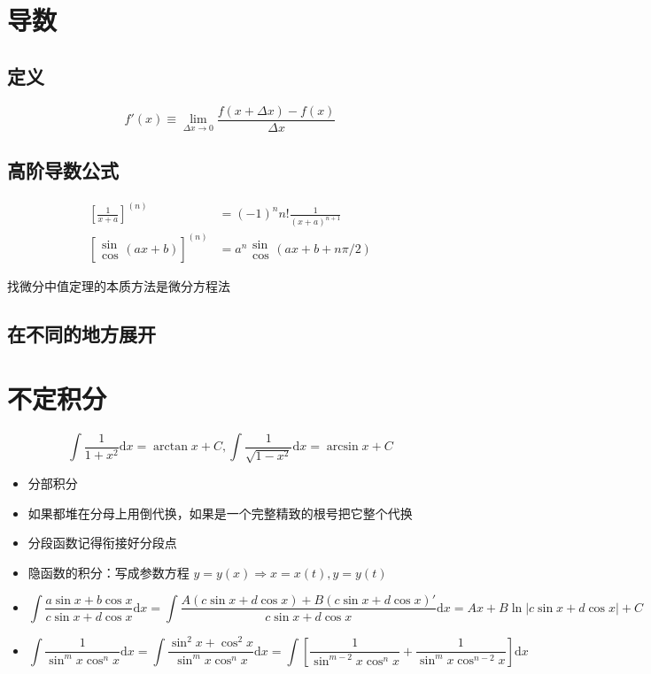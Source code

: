 \documentclass{article}
\begin{document}
\section{导数}

\subsection{定义}

\[ f'(x) \equiv \lim_{\Delta x \to 0} \frac{f(x + \Delta x) - f(x)}{\Delta x} \]

\subsection{高阶导数公式}

\begin{align*}
    \left[\frac{1}{x + a}\right]^{(n)}   & = (-1)^n n! \frac{1}{(x + a)^{n+1}}             \\
    \left[\begin{aligned}
                  \sin \\ \cos
              \end{aligned} (a x + b)\right]^{(n)} & = a^n \begin{aligned}
                                                           \sin \\ \cos
                                                       \end{aligned} (a x + b + n \pi / 2)
\end{align*}

找微分中值定理的本质方法是微分方程法

\subsection{在不同的地方展开}

\section{不定积分}

\[ \int \frac{1}{1 + x^2} \mathrm{d}x = \arctan x + C, \int \frac{1}{\sqrt{1 - x^2}} \mathrm{d}x = \arcsin x + C \]

\begin{itemize}
    \item 分部积分
    \item 如果都堆在分母上用倒代换，如果是一个完整精致的根号把它整个代换
    \item 分段函数记得衔接好分段点
    \item 隐函数的积分：写成参数方程 $y = y(x) \Rightarrow x = x(t), y = y(t)$
    \item \[ \int \frac{a \sin x + b \cos x}{c \sin x + d \cos x} \mathrm{d}x = \int \frac{A (c \sin x + d \cos x) + B (c \sin x + d \cos x)'}{c \sin x + d \cos x} \mathrm{d}x = A x + B \ln |c \sin x + d \cos x| + C \]
    \item \[ \int \frac{1}{\sin^m x \cos^n x} \mathrm{d}x = \int \frac{\sin^2x + \cos^2 x}{\sin^m x \cos^n x} \mathrm{d}x = \int \left[\frac{1}{\sin^{m-2} x \cos^n x} + \frac{1}{\sin^m x \cos^{n-2} x}\right] \mathrm{d}x \]
\end{itemize}
\end{document}
